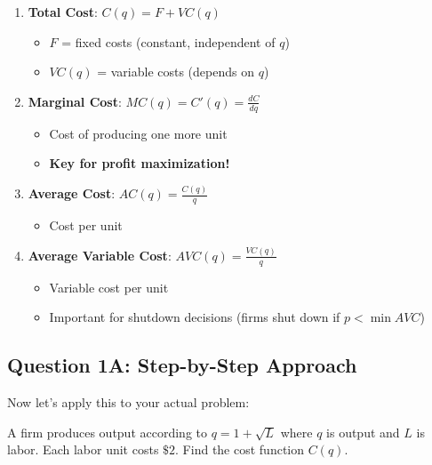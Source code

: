 \documentclass[12pt]{article}
\begin{document}
\begin{keyidea}
\begin{enumerate}
\item \textbf{Total Cost}: $C(q) = F + VC(q)$
\begin{itemize}
\item $F$ = fixed costs (constant, independent of $q$)
\item $VC(q)$ = variable costs (depends on $q$)
\end{itemize}

\item \textbf{Marginal Cost}: $MC(q) = C'(q) = \frac{dC}{dq}$
\begin{itemize}
\item Cost of producing one more unit
\item \textbf{Key for profit maximization!}
\end{itemize}

\item \textbf{Average Cost}: $AC(q) = \frac{C(q)}{q}$
\begin{itemize}
\item Cost per unit
\end{itemize}

\item \textbf{Average Variable Cost}: $AVC(q) = \frac{VC(q)}{q}$
\begin{itemize}
\item Variable cost per unit
\item Important for shutdown decisions (firms shut down if $p < \min AVC$)
\end{itemize}
\end{enumerate}
\end{keyidea}

\newpage

\subsection{Question 1A: Step-by-Step Approach}

Now let's apply this to your actual problem:

\begin{tcolorbox}[colback=yellow!10, colframe=orange, title=\textbf{Problem 1A}]
A firm produces output according to $q = 1 + \sqrt{L}$ where $q$ is output and $L$ is labor. Each labor unit costs $\$2$. Find the cost function $C(q)$.
\end{tcolorbox}

\vspace{0.3cm}
\end{document}
